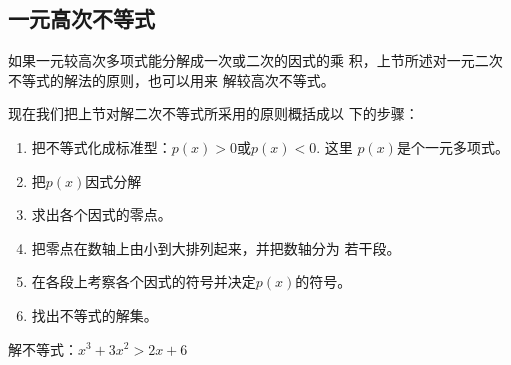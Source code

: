 \subsection{一元高次不等式}
如果一元较高次多项式能分解成一次或二次的因式的乘
积，上节所述对一元二次不等式的解法的原则，也可以用来
解较高次不等式。

现在我们把上节对解二次不等式所采用的原则概括成以
下的步骤：
\begin{enumerate}
    \item 把不等式化成标准型：$p(x)>0$或$p(x)<0$. 这里
$p(x)$是个一元多项式。
\item 把$p(x)$因式分解
\item 求出各个因式的零点。
\item 把零点在数轴上由小到大排列起来，并把数轴分为
若干段。
\item 在各段上考察各个因式的符号并决定$p(x)$的符号。
\item 找出不等式的解集。
\end{enumerate}


\begin{example}
    解不等式：$x^3+3x^2>2x+6$
\end{example}

